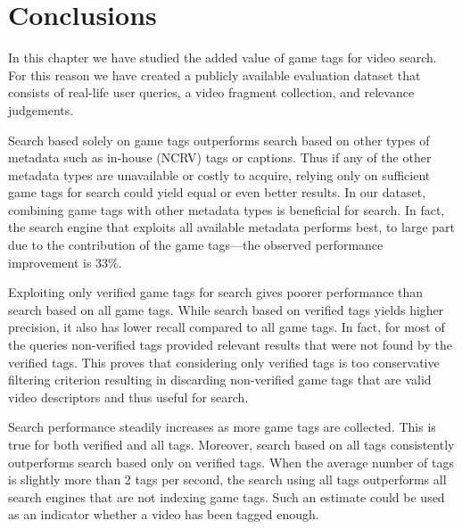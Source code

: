 \section{Conclusions}\label{sec:conclusions}
In this chapter we have studied the added value of game tags for video search. For this reason we have created a publicly available evaluation dataset that consists of real-life user queries, a video fragment collection, and relevance judgements. 

Search based solely on game tags outperforms search based on other types of metadata such as in-house (NCRV) tags or captions. Thus if any of the other metadata types are unavailable or costly to acquire, relying only on sufficient game tags for search could yield equal or even better results. In our dataset, combining game tags with other metadata types is beneficial for search. In fact, the search engine that exploits all available metadata performs best, to large part due to the contribution of the game tags---the observed performance improvement is 33\%. 

Exploiting only verified game tags for search gives poorer performance than search based on all game tags. While search based on verified tags yields higher precision, it also has lower recall compared to all game tags. In fact, for most of the queries non-verified tags provided relevant results that were not found by the verified tags. This proves that considering only verified tags is too conservative filtering criterion resulting in discarding non-verified game tags that are valid video descriptors and thus useful for search. 

Search performance steadily increases as more game tags are collected. This is true for both verified and all tags. Moreover, search based on all tags consistently outperforms search based only on verified tags. When the average number of tags is slightly more than 2 tags per second, the search using all tags outperforms all search engines that are not indexing game tags. Such an estimate could be used as an indicator whether a video has been tagged enough.

